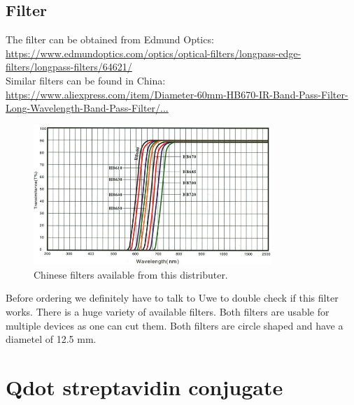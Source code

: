 \documentclass{article}
\begin{document}
\subsection{Filter}
The filter can be obtained from Edmund Optics:\\
\href{https://www.edmundoptics.com/optics/optical-filters/longpass-edge-filters/longpass-filters/64621/}{https://www.edmundoptics.com/optics/optical-filters/longpass-edge-filters/longpass-filters/64621/}\\
Similar filters can be found in China:\\
\href{https://www.aliexpress.com/item/Diameter-60mm-HB670-IR-Band-Pass-Filter-Long-Wavelength-Band-Pass-Filter/32766997403.html?spm=2114.01010208.3.10.iVA9gb&ws_ab_test=searchweb0_0,searchweb201602_3_10065_10068_10136_10137_10138_10060_10062_10141_10056_10055_10054_122_10059_10099_10103_10102_10096_10052_10053_10050_10107_10142_10051_10143_10084_10083_10080_10082_10081_10110_10111_10112_10113_10114_10078_10079_10073_10070_10123_10124,searchweb201603_2,afswitch_1,ppcSwitch_4,single_sort_0_default&btsid=882bb4cb-2a55-4d1b-8d9b-0348a7b8ec5f&algo_expid=ee21d12d-5045-4fab-93e1-0a0a214c0df0-1&algo_pvid=ee21d12d-5045-4fab-93e1-0a0a214c0df0}{https://www.aliexpress.com/item/Diameter-60mm-HB670-IR-Band-Pass-Filter-Long-Wavelength-Band-Pass-Filter/...}
\begin{figure}[H]
	\centering
	\includegraphics[width=0.8\textwidth]{./fig/spectra_filter_china}
	\caption{Chinese filters available from this distributer.}
	\label{fig:chines_filter}
\end{figure}
Before ordering we definitely have to talk to Uwe to double check if this filter works. There is a huge variety of available filters. Both filters are usable for multiple devices as one can cut them. Both filters are circle shaped and have a diametel of 12.5 mm.  

\section{Qdot streptavidin conjugate}
\end{document}

